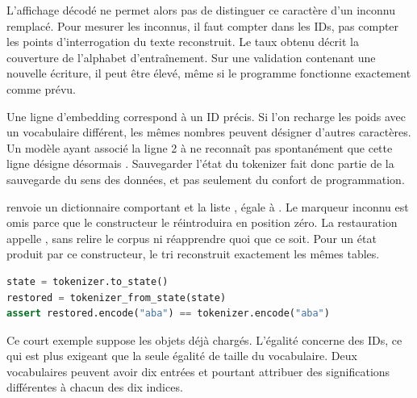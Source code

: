 L'affichage décodé ne permet alors pas de distinguer ce caractère d'un inconnu
remplacé. Pour mesurer les inconnus, il faut compter  dans les
IDs, pas compter les points d'interrogation du texte reconstruit.
Le taux obtenu décrit la couverture de l'alphabet d'entraînement.
Sur une validation contenant une nouvelle écriture, il peut être élevé,
même si le programme fonctionne exactement comme prévu.


Une ligne d'embedding correspond à un ID précis. Si l'on recharge les poids
avec un vocabulaire différent, les mêmes nombres peuvent désigner d'autres
caractères. Un modèle ayant associé la ligne 2 à  ne reconnaît pas
spontanément que cette ligne désigne désormais .
Sauvegarder l'état du tokenizer fait donc partie de la sauvegarde du sens
des données, et pas seulement du confort de programmation.

 renvoie un dictionnaire comportant  et
la liste , égale à .
Le marqueur inconnu est omis parce que le constructeur le réintroduira en
position zéro. La restauration appelle ,
sans relire le corpus ni réapprendre quoi que ce soit.
Pour un état produit par ce constructeur, le tri reconstruit exactement
les mêmes tables.

\begin{lstlisting}[language=Python]
state = tokenizer.to_state()
restored = tokenizer_from_state(state)
assert restored.encode("aba") == tokenizer.encode("aba")
\end{lstlisting}

Ce court exemple suppose les objets déjà chargés. L'égalité concerne des
IDs, ce qui est plus exigeant que la seule égalité de taille du vocabulaire.
Deux vocabulaires peuvent avoir dix entrées et pourtant attribuer des
significations différentes à chacun des dix indices.

